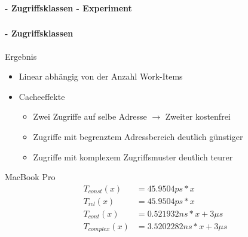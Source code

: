 \documentclass{beamer}
\begin{document}
\begin{frame}
	\frametitle{}
	\framesubtitle{ - Zugriffsklassen - Experiment}
	\begin{figure}[hbp]
	\centering
	\end{figure}
\end{frame}

\begin{frame}
	\frametitle{}
	\framesubtitle{ - Zugriffsklassen}
	\begin{block}{Ergebnis}
		\begin{itemize}
			\item Linear abhängig von der Anzahl Work-Items
			\item Cacheeffekte
			\begin{itemize}
				\item Zwei Zugriffe auf selbe Adresse $\rightarrow$ Zweiter kostenfrei
				\item Zugriffe mit begrenztem Adressbereich deutlich günstiger	
				\item Zugriffe mit komplexem Zugriffsmuster deutlich teurer
			\end{itemize}
		\end{itemize}	
	\end{block}
	\begin{block}{MacBook Pro}
		\begin{align*}
			T_{const}(x) &= 45.9504ps * x\\
        		T_{ivl}(x) &= 45.9504ps * x\\
        		T_{cont}(x) &= 0.521932ns * x + 3\mu s\\
        		T_{complex}(x) &= 3.5202282ns * x + 3\mu s
		\end{align*}
	\end{block}
\end{frame}
\end{document}
